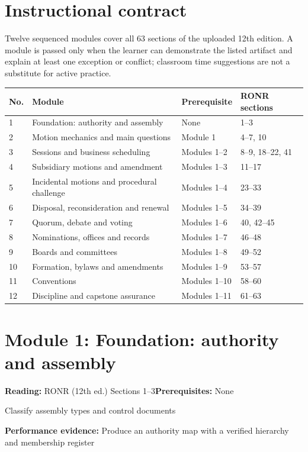 \documentclass[11pt]{article}
\begin{document}
\SuiteOpen
{}
\section{Instructional contract}
Twelve sequenced modules cover all 63 sections of the uploaded 12th edition. A module is passed only when the learner can demonstrate the listed artifact and explain at least one exception or conflict; classroom time suggestions are not a substitute for active practice.

\begin{longtable}{@{}p{.07\linewidth}p{.31\linewidth}p{.17\linewidth}p{.33\linewidth}@{}}\toprule\textbf{No.}&\textbf{Module}&\textbf{Prerequisite}&\textbf{RONR sections}\\\midrule\endhead
1 & Foundation: authority and assembly & None & 1--3\\
2 & Motion mechanics and main questions & Module 1 & 4--7, 10\\
3 & Sessions and business scheduling & Modules 1--2 & 8--9, 18--22, 41\\
4 & Subsidiary motions and amendment & Modules 1--3 & 11--17\\
5 & Incidental motions and procedural challenge & Modules 1--4 & 23--33\\
6 & Disposal, reconsideration and renewal & Modules 1--5 & 34--39\\
7 & Quorum, debate and voting & Modules 1--6 & 40, 42--45\\
8 & Nominations, offices and records & Modules 1--7 & 46--48\\
9 & Boards and committees & Modules 1--8 & 49--52\\
10 & Formation, bylaws and amendments & Modules 1--9 & 53--57\\
11 & Conventions & Modules 1--10 & 58--60\\
12 & Discipline and capstone assurance & Modules 1--11 & 61--63\\
\bottomrule\end{longtable}
\section{Module 1: Foundation: authority and assembly}
\textbf{Reading:} RONR (12th ed.) Sections 1--3\quad\textbf{Prerequisites:} None

Classify assembly types and control documents

\textbf{Performance evidence:} Produce an authority map with a verified hierarchy and membership register
\end{document}
